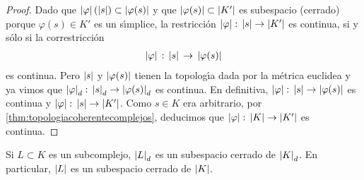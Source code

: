 \begin{proof}
	Dado que $\left|\varphi\right|(\left|s\right|)\subset\left|\varphi(s)\right|$ y
	que $\left|\varphi(s)\right|\subset\left|K'\right|$ es subespacio (cerrado)
	porque $\varphi(s)\in K'$ es un s\'{\i}mplice, la restricci\'{o}n
	$\left|\varphi\right|:\,\left|s\right|\rightarrow\left|K'\right|$ es continua, si y
	s\'{o}lo si la correstricci\'{o}n
	\begin{align*}
		\left|\varphi\right| \,:\,\left|s\right|\,\rightarrow\,
			\left|\varphi(s)\right|
	\end{align*}
	es continua. Pero $\left|s\right|$ y $\left|\varphi(s)\right|$ tienen
	la topolog\'{\i}a dada por la m\'{e}trica euclidea y ya vimos
	que $\left|\varphi\right|_{d}:\,\left|s\right|_{d}\rightarrow\left|\varphi(s)\right|_{d}$
	es continua. En definitiva,
	$\left|\varphi\right|:\,\left|s\right|\rightarrow\left|\varphi(s)\right|$ es continua
	y $\left|\varphi\right|:\,\left|s\right|\rightarrow\left|K'\right|$. Como
	$s\in K$ era arbitrario, por \ref{thm:topologiacoherentecomplejos},
	deducimos que $\left|\varphi\right|:\,\left|K\right|\rightarrow\left|K'\right|$ es
	continua.
\end{proof}

\begin{coroTopologiaCoherenteSubcomplejos}%
	\label{thm:topologiacoherentesubcomplejos}
	Si $L\subset K$ es un subcomplejo, $\left|L\right|_{d}$ es un subespacio
	cerrado de $\left|K\right|_{d}$. En particular, $\left|L\right|$ es un
	subespacio cerrado de $\left|K\right|$.
\end{coroTopologiaCoherenteSubcomplejos}

